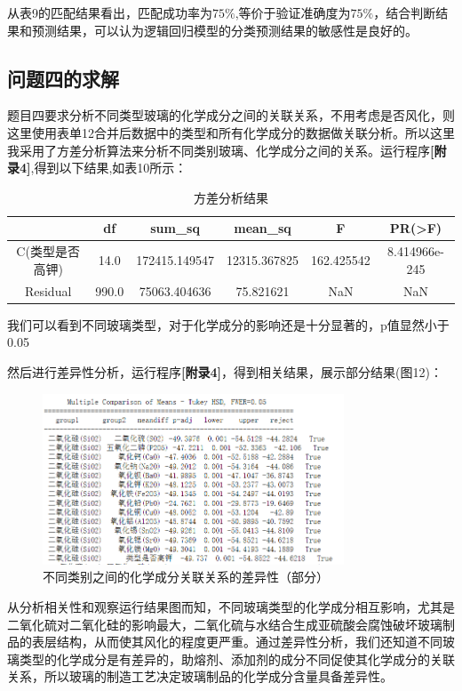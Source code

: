 \documentclass[withoutpreface,bwprint]{cumcmthesis}%
\begin{document}
	从表9的匹配结果看出，匹配成功率为$75\%$,等价于验证准确度为$75\%$，结合判断结果和预测结果，可以认为逻辑回归模型的分类预测结果的敏感性是良好的。
	
	\subsection{问题四的求解}
	题目四要求分析不同类型玻璃的化学成分之间的关联关系，不用考虑是否风化，则这里使用表单12合并后数据中的类型和所有化学成分的数据做关联分析。所以这里我采用了方差分析算法来分析不同类别玻璃、化学成分之间的关系。运行程序\textbf{[附录4]},得到以下结果,如表10所示：
	
	\begin{table}[!htb]
		\centering
		\caption{方差分析结果}
		\begin{tabular}{cccccc}
			\toprule[1.5pt]
			&df	&sum\_sq	&mean\_sq&F&PR(>F)\\
			\midrule[1pt]
			C(类型是否高钾)&14.0&172415.149547&12315.367825&162.425542&8.414966e-245\\
			\hline
			Residual&990.0&75063.404636&75.821621&NaN&NaN\\
			\bottomrule[1.5pt]
		\end{tabular}
	\end{table}
	我们可以看到不同玻璃类型，对于化学成分的影响还是十分显著的，p值显然小于0.05
	
	然后进行差异性分析，运行程序\textbf{[附录4]}，得到相关结果，展示部分结果(图12)：
	\begin{figure}[!h]
		\centering
		\includegraphics[width=0.8\textwidth]{ph12}
		\caption{不同类别之间的化学成分关联关系的差异性（部分）}
		\label{fig:ph12}
	\end{figure}
	
	从分析相关性和观察运行结果图而知，不同玻璃类型的化学成分相互影响，尤其是二氧化硫对二氧化硅的影响最大，二氧化硫与水结合生成亚硫酸会腐蚀破坏玻璃制品的表层结构，从而使其风化的程度更严重。通过差异性分析，我们还知道不同玻璃类型的化学成分是有差异的，助熔剂、添加剂的成分不同促使其化学成分的关联关系，所以玻璃的制造工艺决定玻璃制品的化学成分含量具备差异性。
	
\end{document}
